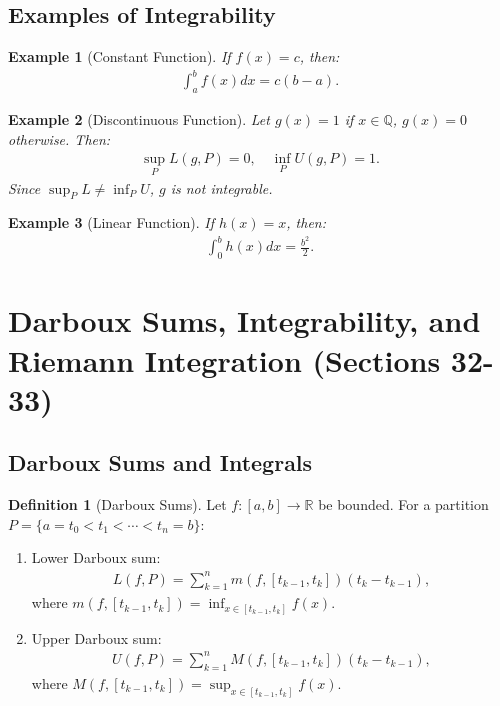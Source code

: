 \documentclass[9pt]{article}
\theoremstyle{definition}
\newtheorem{definition}{Definition}
\theoremstyle{plain}
\newtheorem{example}{Example}
\begin{document}
\subsection*{Examples of Integrability}
\begin{example}[Constant Function]
If $ f(x) = c $, then:
\begin{align}
\int_a^b f(x) dx = c(b-a).
\end{align}
\end{example}

\begin{example}[Discontinuous Function]
Let $ g(x) = 1 $ if $ x \in \mathbb{Q} $, $ g(x) = 0 $ otherwise. Then:
\begin{align}
\sup_P L(g, P) = 0, \quad \inf_P U(g, P) = 1.
\end{align}
Since $ \sup_P L \neq \inf_P U $, $ g $ is not integrable.
\end{example}

\begin{example}[Linear Function]
If $ h(x) = x $, then:
\begin{align}
\int_0^b h(x) dx = \frac{b^2}{2}.
\end{align}
\end{example}
\section*{Darboux Sums, Integrability, and Riemann Integration (Sections 32-33)}

\subsection*{Darboux Sums and Integrals}
\begin{definition}[Darboux Sums]
Let $ f : [a, b] \to \mathbb{R} $ be bounded. For a partition $ P = \{a = t_0 < t_1 < \cdots < t_n = b\} $:
\begin{enumerate}
    \item Lower Darboux sum:
    \begin{align}
    L(f, P) = \sum_{k=1}^n m(f, [t_{k-1}, t_k])(t_k - t_{k-1}),
    \end{align}
    where $ m(f, [t_{k-1}, t_k]) = \inf_{x \in [t_{k-1}, t_k]} f(x) $.
    \item Upper Darboux sum:
    \begin{align}
    U(f, P) = \sum_{k=1}^n M(f, [t_{k-1}, t_k])(t_k - t_{k-1}),
    \end{align}
    where $ M(f, [t_{k-1}, t_k]) = \sup_{x \in [t_{k-1}, t_k]} f(x) $.
\end{enumerate}
\end{definition}
\end{document}
